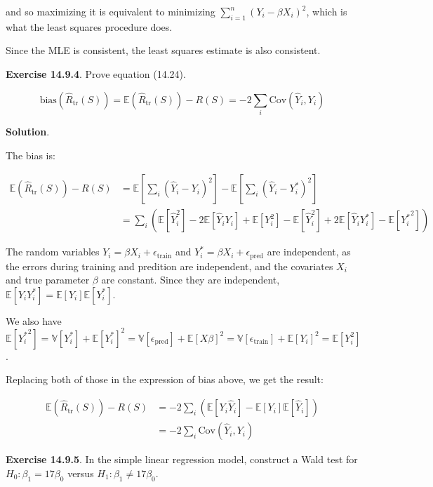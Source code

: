 and so maximizing it is equivalent to minimizing
\(\sum_{i=1}^{n} (Y_{i} - \beta X_{i})^{2}\), which is what the least squares
procedure does.

Since the MLE is consistent, the least squares estimate is also
consistent.

\textbf{Exercise 14.9.4}. Prove equation (14.24).

\[ \text{bias}(\hat{R}_\text{tr}(S)) = \mathbb{E}(\hat{R}_\text{tr}(S)) - R(S) = -2 \sum_{i} \text{Cov}(\hat{Y}_{i}, Y_{i}) \]

\textbf{Solution}.

The bias is:

\begin{align*}
\mathbb{E}(\hat{R}_\text{tr}(S)) - R(S) &= \mathbb{E}\left[\sum_{i} (\hat{Y}_{i}- Y_{i})^{2} \right] - \mathbb{E} \left[ \sum_{i} (\hat{Y}_{i} - Y_{i}^*)^{2} \right] \\
&= \sum_{i} \left( \mathbb{E} \left[\hat{Y}_{i}^{2} \right] - 2 \mathbb{E} \left[\hat{Y}_{i} Y_{i} \right] + \mathbb{E}\left[Y_{i}^{2} \right] - \mathbb{E} \left[\hat{Y}_{i}^{2} \right] + 2 \mathbb{E} \left[\hat{Y}_{i} Y_{i}^* \right] - \mathbb{E}\left[{Y_{i}^*}^{2} \right] \right)
\end{align*}

The random variables \(Y_{i} = \beta X_{i} + \epsilon_\text{train}\) and
\(Y_{i}^* = \beta X_{i} + \epsilon_\text{pred}\) are independent, as the
errors during training and predition are independent, and the covariates
\(X_{i}\) and true parameter \(\beta\) are constant. Since they are
independent,
\(\mathbb{E}[Y_{i} Y_{i}^*] = \mathbb{E}[Y_{i}] \mathbb{E}[Y_{i}^*]\).

We also have
\(\mathbb{E} [ {Y_{i}^*}^{2} ] = \mathbb{V}[Y_{i}^*] + \mathbb{E}[Y_{i}^*]^{2} = \mathbb{V}[\epsilon_\text{pred}] + \mathbb{E}[X \beta]^{2} = \mathbb{V}[\epsilon_\text{train}] + \mathbb{E}[Y_{i}]^{2} = \mathbb{E} [Y_{i}^{2}]\).

Replacing both of those in the expression of bias above, we get the
result:

\begin{align*}
\mathbb{E}(\hat{R}_\text{tr}(S)) - R(S) &= 
-2 \sum_{i} \left( \mathbb{E}[Y_{i} \hat{Y}_{i}] - \mathbb{E}[Y_{i}] \mathbb{E}[\hat{Y}_{i}] \right) \\
&= -2 \sum_{i} \text{Cov}(\hat{Y}_{i}, Y_{i})
\end{align*}

\textbf{Exercise 14.9.5}. In the simple linear regression model,
construct a Wald test for \(H_{0} : \beta_{1} = 17 \beta_{0}\) versus
\(H_{1} : \beta_{1} \neq 17 \beta_{0}\).

